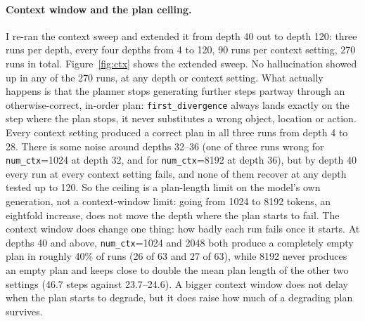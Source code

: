 
\paragraph{Context window and the plan ceiling.} I re-ran the context sweep and
extended it from depth 40 out to depth 120: three runs per depth, every four
depths from 4 to 120, 90 runs per context setting, 270 runs in total.
Figure~\ref{fig:ctx} shows the extended sweep. No hallucination showed up in any
of the 270 runs, at any depth or context setting. What actually happens is that
the planner stops generating further steps partway through an otherwise-correct,
in-order plan: \texttt{first\_divergence} always lands exactly on the step where
the plan stops, it never substitutes a wrong object, location or action. Every
context setting produced a correct plan in all three runs from depth 4 to 28.
There is some noise around depths 32--36 (one of three runs wrong for
\texttt{num\_ctx}=1024 at depth 32, and for \texttt{num\_ctx}=8192 at depth 36),
but by depth 40 every run at every context setting fails, and none of them
recover at any depth tested up to 120. So the ceiling is a plan-length limit on
the model's own generation, not a context-window limit: going from 1024 to 8192
tokens, an eightfold increase, does not move the depth where the plan starts to
fail. The context window does change one thing: how badly each run fails once it
starts. At depths 40 and above, \texttt{num\_ctx}=1024 and 2048 both produce a
completely empty plan in roughly 40\% of runs (26 of 63 and 27 of 63), while 8192
never produces an empty plan and keeps close to double the mean plan length of
the other two settings (46.7 steps against 23.7--24.6). A bigger context window
does not delay when the plan starts to degrade, but it does raise how much of a
degrading plan survives.


